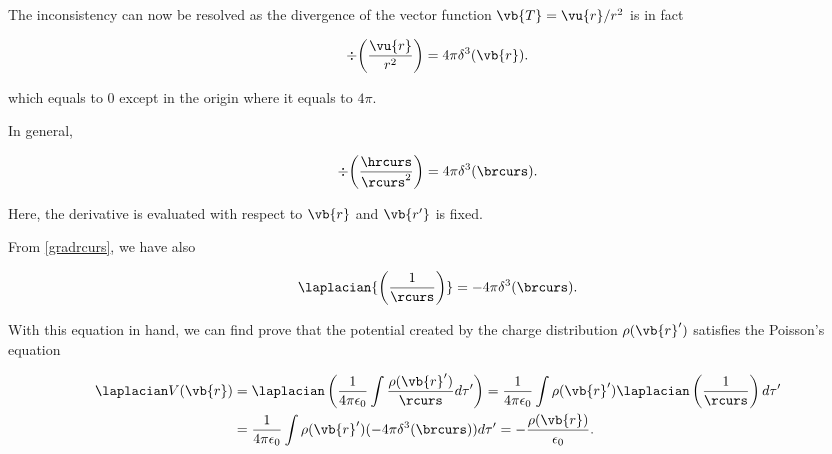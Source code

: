 \documentclass[english,a4paper,12pt]{report}
\begin{document}
The inconsistency can now be resolved as the divergence of the vector function \(\vb{T} = \vu{r} /r^2\) is in fact
	
\begin{equation} 
	\div{\left(\frac{\vu{r}}{r^2}\right)} = 4\pi\delta^3(\vb{r}). 
\end{equation}
	 
which equals to 0 except in the origin where it equals to \(4\pi\).
	
In general,
	
\begin{equation} 
	\div{\left(\frac{\hrcurs}{\rcurs^2}\right)} = 4\pi\delta^3(\brcurs). \label{divdelta} 
\end{equation} 
 	
Here, the derivative is evaluated with respect to \(\vb{r}\) and \(\vb{r'}\) is fixed.
 	
From \cref{gradrcurs}, we have also
 	
\begin{equation} 
	\laplacian{\left(\frac{1}{\rcurs}\right)} = -4\pi\delta^3(\brcurs). \label{laprj} 
\end{equation}

With this equation in hand, we can find prove that the potential created by the charge distribution \(\rho (\vb{r} ')\) satisfies the Poisson's equation 

\begin{equation}
	\begin{aligned} 
	\laplacian V(\vb{r} ) &= \laplacian  \left( \frac{1}{4\pi \epsilon_0} \int \frac{\rho (\vb{r} ')}{\rcurs }d\tau '  \right) = \frac{1}{4\pi \epsilon_0} \int \rho (\vb{r} ') \laplacian \left( \frac{1}{\rcurs }  \right) d\tau' \\
	&= \frac{1}{4\pi \epsilon_0} \int \rho (\vb{r} ')(-4\pi \delta ^3 (\brcurs ))d\tau ' = -\frac{\rho (\vb{r} )}{\epsilon_0 }.   
	\end{aligned} 
\end{equation}
\end{document}
